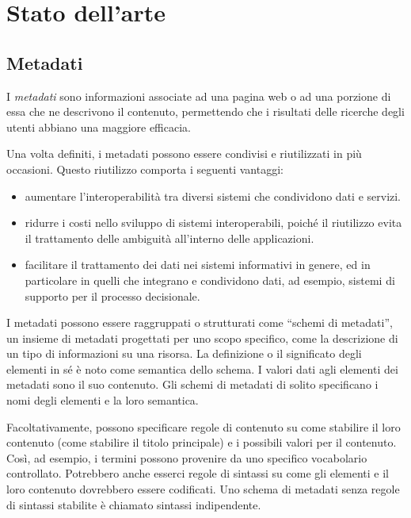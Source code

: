 \clearpage{\pagestyle{empty}\cleardoublepage}
\lhead[\fancyplain{}{\bfseries\thepage}]{\fancyplain{}{\bfseries\rightmark}}
\chapter{Stato dell'arte}
\section{Metadati}
I \textit{metadati} sono informazioni associate ad una pagina web o ad una porzione di essa che ne descrivono il contenuto, permettendo che i risultati delle ricerche degli utenti abbiano una maggiore efficacia.

Una volta definiti, i metadati possono essere condivisi e riutilizzati in più occasioni. Questo riutilizzo comporta i seguenti vantaggi:
\begin{itemize}
\item aumentare l'interoperabilità tra diversi sistemi che condividono dati e servizi.
\item ridurre i costi nello sviluppo di sistemi interoperabili, poiché il riutilizzo evita il trattamento delle ambiguità all'interno delle applicazioni.
\item facilitare il trattamento dei dati nei sistemi informativi in genere, ed in particolare in quelli che integrano e condividono dati, ad esempio, sistemi di supporto per il processo decisionale.
\end{itemize}

I metadati possono essere raggruppati o strutturati come “schemi di metadati”, un insieme di metadati progettati per uno scopo specifico, come la descrizione di un tipo di informazioni su una risorsa. La definizione o il significato degli elementi in sé è noto come semantica dello schema. I valori dati agli elementi dei metadati sono il suo contenuto. Gli schemi di metadati di solito specificano i nomi degli elementi e la loro semantica.

Facoltativamente, possono specificare regole di contenuto su come stabilire il loro contenuto (come stabilire il titolo principale) e i possibili valori per il contenuto. Così, ad esempio, i termini possono provenire da uno specifico vocabolario controllato. Potrebbero anche esserci regole di sintassi su come gli elementi e il loro contenuto dovrebbero essere codificati. Uno schema di metadati senza regole di sintassi stabilite è chiamato sintassi indipendente.


